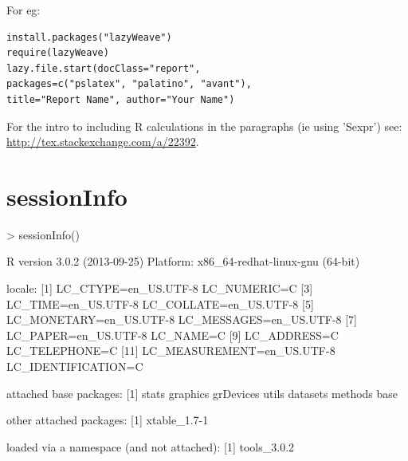 \documentclass[a4paper]{report}
\begin{document}
For eg:
\begin{verbatim}
install.packages("lazyWeave")
require(lazyWeave)
lazy.file.start(docClass="report", 
packages=c("pslatex", "palatino", "avant"), 
title="Report Name", author="Your Name")
\end{verbatim}

For the intro to including R calculations in the paragraphs (ie using 'Sexpr') see:
\url{http://tex.stackexchange.com/a/22392}.
\section{sessionInfo}
\begin{Schunk}
\begin{Sinput}
> sessionInfo()
\end{Sinput}
\begin{Soutput}
R version 3.0.2 (2013-09-25)
Platform: x86_64-redhat-linux-gnu (64-bit)

locale:
 [1] LC_CTYPE=en_US.UTF-8       LC_NUMERIC=C              
 [3] LC_TIME=en_US.UTF-8        LC_COLLATE=en_US.UTF-8    
 [5] LC_MONETARY=en_US.UTF-8    LC_MESSAGES=en_US.UTF-8   
 [7] LC_PAPER=en_US.UTF-8       LC_NAME=C                 
 [9] LC_ADDRESS=C               LC_TELEPHONE=C            
[11] LC_MEASUREMENT=en_US.UTF-8 LC_IDENTIFICATION=C       

attached base packages:
[1] stats     graphics  grDevices utils     datasets  methods   base     

other attached packages:
[1] xtable_1.7-1

loaded via a namespace (and not attached):
[1] tools_3.0.2
\end{Soutput}
\end{Schunk}
\end{document}
